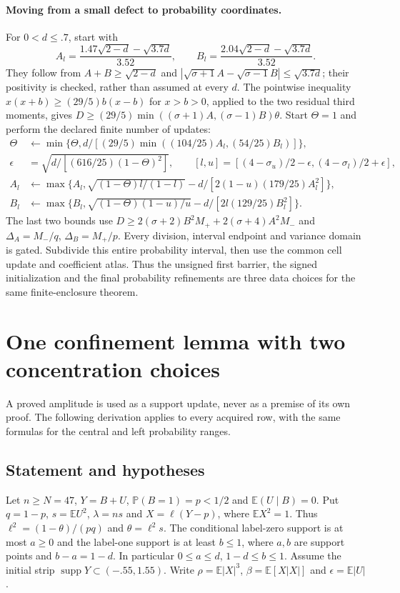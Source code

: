 \documentclass[11pt,a4paper]{article}
\numberwithin{equation}{section}
\theoremstyle{definition}
\theoremstyle{remark}
\newcommand{\E}{\mathbb E}
\newcommand{\Pp}{\mathbb P}
\begin{document}
\paragraph{Moving from a small defect to probability coordinates.}
For $0<d\le.7$, start with
\[
 A_l=\frac{1.47\sqrt{2-d}-\sqrt{3.7d}}{3.52},\qquad
 B_l=\frac{2.04\sqrt{2-d}-\sqrt{3.7d}}{3.52}.
\]
They follow from $A+B\ge\sqrt{2-d}$ and
$|\sqrt{\sigma+1}A-\sqrt{\sigma-1}B|\le\sqrt{3.7d}$;
their positivity is checked, rather than assumed at every $d$.
The pointwise inequality
$x(x+b)\ge(29/5)b(x-b)$ for $x>b>0$, applied to the two residual
third moments, gives
$D\ge(29/5)\min((\sigma+1)A,(\sigma-1)B)\theta$.
Start $\Theta=1$ and perform the declared finite number of updates:
\begin{align*}
 \Theta&\leftarrow\min\{\Theta,d/[(29/5)
                 \min((104/25)A_l,(54/25)B_l)]\},\\
 \epsilon&=\sqrt{d/[(616/25)(1-\Theta)^2]},\qquad
 [l,u]=[(4-\sigma_u)/2-\epsilon,(4-\sigma_l)/2+\epsilon],\\
 A_l&\leftarrow\max\{A_l,\sqrt{(1-\Theta)l/(1-l)}
                           -d/[2(1-u)(179/25)A_l^2]\},\\
 B_l&\leftarrow\max\{B_l,\sqrt{(1-\Theta)(1-u)/u}
                           -d/[2l(129/25)B_l^2]\}.
\end{align*}
The last two bounds use
$D\ge2(\sigma+2)B^2M_++2(\sigma+4)A^2M_-$ and
$\Delta_A=M_-/q$, $\Delta_B=M_+/p$.
Every division, interval endpoint and variance domain is gated.
Subdivide this entire probability interval, then use the common
cell update and coefficient atlas. Thus the unsigned first barrier,
the signed initialization and the final probability refinements are
three data choices for the same finite-enclosure theorem.

\section{One confinement lemma with two concentration choices}\label{cut49:conf:re:confinement}
A proved amplitude is used as a support update, never as a premise of
its own proof. The following derivation applies to every acquired row,
with the same formulas for the central and left probability ranges.
\subsection{Statement and hypotheses}
Let $n\ge N=47$, $Y=B+U$, $\Pp(B=1)=p<1/2$ and $\E(U\mid B)=0$.
Put $q=1-p$, $s=\E U^2$, $\lambda=ns$ and $X=\ell(Y-p)$, where
$\E X^2=1$. Thus $\ell^2=(1-\theta)/(pq)$ and $\theta=\ell^2s$.
The conditional label-zero support is at most $a\ge0$ and the label-one
support is at least $b\le1$, where $a,b$ are support points and
$b-a=1-d$. In particular $0\le a\le d$, $1-d\le b\le1$.
Assume the initial strip $\operatorname{supp}Y\subset(-.55,1.55)$.
Write $\rho=\E|X|^3$, $\beta=\E[X|X|]$ and $\epsilon=\E|U|$.
\end{document}
